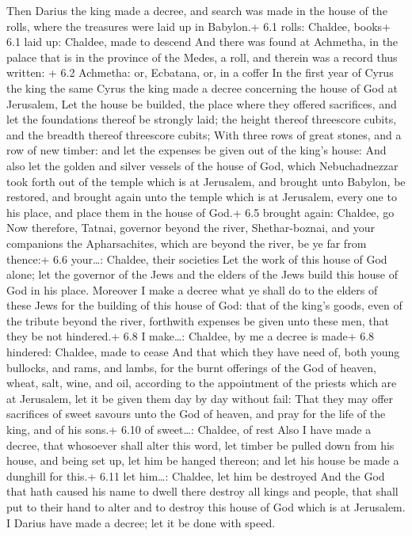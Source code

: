  Then Darius the king made a decree, and search was made in
the house of the rolls, where the treasures were laid up in Babylon.+
6.1 rolls: Chaldee, books+ 6.1 laid up: Chaldee, made to descend
 And there was found at Achmetha, in the palace that is in
the province of the Medes, a roll, and therein was a record thus
written: + 6.2 Achmetha: or, Ecbatana, or, in a coffer  In
the first year of Cyrus the king the same Cyrus the king made a decree
concerning the house of God at Jerusalem, Let the house be builded, the
place where they offered sacrifices, and let the foundations thereof be
strongly laid; the height thereof threescore cubits, and the breadth
thereof threescore cubits;  With three rows of great stones,
and a row of new timber: and let the expenses be given out of the king's
house:  And also let the golden and silver vessels of the
house of God, which Nebuchadnezzar took forth out of the temple which is
at Jerusalem, and brought unto Babylon, be restored, and brought again
unto the temple which is at Jerusalem, every one to his place, and place
them in the house of God.+ 6.5 brought again: Chaldee, go 
Now therefore, Tatnai, governor beyond the river, Shethar-boznai, and
your companions the Apharsachites, which are beyond the river, be ye far
from thence:+ 6.6 your\ldots: Chaldee, their societies  Let
the work of this house of God alone; let the governor of the Jews and
the elders of the Jews build this house of God in his place.
 Moreover I make a decree what ye shall do to the elders of
these Jews for the building of this house of God: that of the king's
goods, even of the tribute beyond the river, forthwith expenses be given
unto these men, that they be not hindered.+ 6.8 I make\ldots: Chaldee,
by me a decree is made+ 6.8 hindered: Chaldee, made to cease
 And that which they have need of, both young bullocks, and
rams, and lambs, for the burnt offerings of the God of heaven, wheat,
salt, wine, and oil, according to the appointment of the priests which
are at Jerusalem, let it be given them day by day without fail:
 That they may offer sacrifices of sweet savours unto the
God of heaven, and pray for the life of the king, and of his sons.+ 6.10
of sweet\ldots: Chaldee, of rest  Also I have made a
decree, that whosoever shall alter this word, let timber be pulled down
from his house, and being set up, let him be hanged thereon; and let his
house be made a dunghill for this.+ 6.11 let him\ldots: Chaldee, let him
be destroyed  And the God that hath caused his name to
dwell there destroy all kings and people, that shall put to their hand
to alter and to destroy this house of God which is at Jerusalem. I
Darius have made a decree; let it be done with speed.

